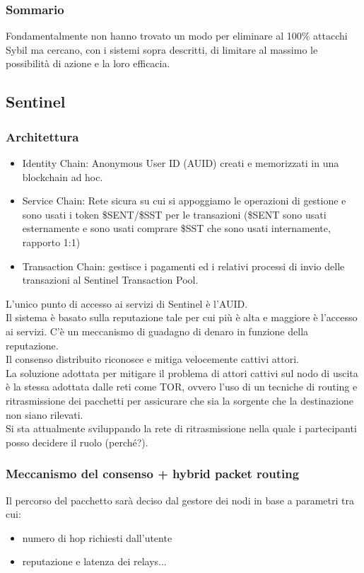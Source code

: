 \documentclass[]{article}
\begin{document}
	\subsubsection{Sommario}	
	Fondamentalmente non hanno trovato un modo per eliminare al 100\% attacchi Sybil ma cercano, con i sistemi sopra descritti, di limitare al massimo le possibilità di azione e la loro efficacia.
	
	
	
	
	
	
	\subsection{Sentinel}
	
	\subsubsection{Architettura}
	\begin{itemize}
	\item Identity Chain: Anonymous User ID (AUID) creati e memorizzati in una blockchain ad hoc.
	\item Service Chain: Rete sicura su cui si appoggiamo le operazioni di gestione e sono usati i token \$SENT/\$SST per le transazioni (\$SENT sono usati esternamente e sono usati comprare \$SST che sono usati internamente, rapporto 1:1)
	\item Transaction Chain: gestisce i pagamenti ed i relativi processi di invio delle transazioni al Sentinel Transaction Pool.
	\end{itemize}	
	L’unico punto di accesso ai servizi di Sentinel è l’AUID.\\
	Il sistema è basato sulla reputazione tale per cui più è alta e maggiore è l’accesso ai servizi. C’è un meccanismo di guadagno di denaro in funzione della reputazione.\\
	Il consenso distribuito riconosce e mitiga velocemente cattivi attori.\\
	La soluzione adottata per mitigare il problema di attori cattivi sul nodo di uscita è la stessa adottata dalle reti come TOR, ovvero l’uso di un tecniche di routing e ritrasmissione dei pacchetti per assicurare che sia la sorgente che la destinazione non siano rilevati.\\
	Si sta attualmente sviluppando la rete di ritrasmissione nella quale i partecipanti posso decidere il ruolo (perché?).	
	\subsubsection{Meccanismo del consenso + hybrid packet routing}	
	Il percorso del pacchetto sarà deciso dal gestore dei nodi in base a parametri tra cui:
	\begin{itemize}
		\item numero di hop richiesti dall’utente
		\item reputazione e latenza dei relays...
	\end{itemize}	
\end{document}
